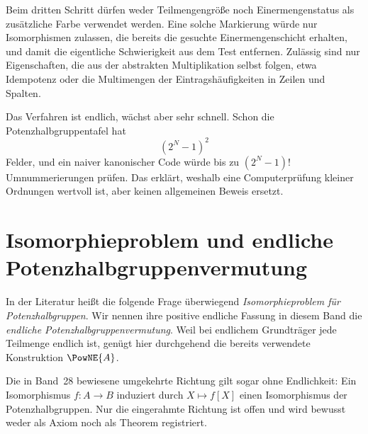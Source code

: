 \documentclass[main.tex]{subfiles}
\begin{document}
\begin{remark}
Beim dritten Schritt dürfen weder Teilmengengröße noch Einermengenstatus als
zusätzliche Farbe verwendet werden.  Eine solche Markierung würde nur
Isomorphismen zulassen, die bereits die gesuchte Einermengenschicht erhalten,
und damit die eigentliche Schwierigkeit aus dem Test entfernen.  Zulässig
sind nur Eigenschaften, die aus der abstrakten Multiplikation selbst folgen,
etwa Idempotenz oder die Multimengen der Eintragshäufigkeiten in Zeilen und
Spalten.
\end{remark}

Das Verfahren ist endlich, wächst aber sehr schnell.  Schon die
Potenzhalbgruppentafel hat
\[
  (2^N-1)^2
\]
Felder, und ein naiver kanonischer Code würde bis zu
\((2^N-1)!\) Umnummerierungen prüfen.  Das erklärt, weshalb eine
Computerprüfung kleiner Ordnungen wertvoll ist, aber keinen allgemeinen
Beweis ersetzt.

\section{Isomorphieproblem und endliche Potenzhalbgruppenvermutung}

In der Literatur heißt die folgende Frage überwiegend
\emph{Isomorphieproblem für Potenzhalbgruppen}.  Wir nennen ihre positive
endliche Fassung in diesem Band die \emph{endliche
Potenzhalbgruppenvermutung}.  Weil bei endlichem Grundträger jede Teilmenge
endlich ist, genügt hier durchgehend die bereits verwendete Konstruktion
\(\PowNE{A}\).

\begin{samepage}
\begin{center}
\end{center}
\end{samepage}

Die in Band~28 bewiesene umgekehrte Richtung gilt sogar ohne Endlichkeit:
Ein Isomorphismus \(f\colon A\to B\) induziert durch \(X\mapsto f[X]\) einen
Isomorphismus der Potenzhalbgruppen.  Nur die eingerahmte Richtung ist offen
und wird bewusst weder als Axiom noch als Theorem registriert.
\end{document}
